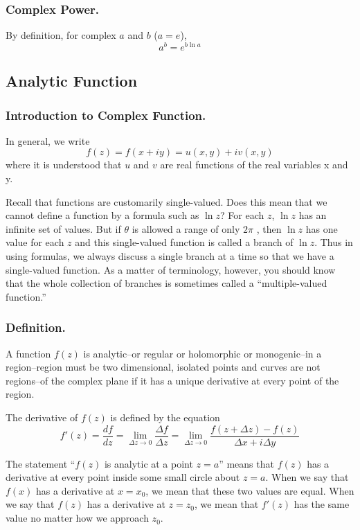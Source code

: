 \documentclass[../../../main.tex]{subfiles}
\begin{document}
\subsubsection{Complex Power.} By deﬁnition, for complex $a$ and $b$ ($a = e$),
\begin{equation*}
    a^b=e^{b\ln a}
\end{equation*}

\subsection{Analytic Function}
\subsubsection{Introduction to Complex Function.} In general, we write
\begin{equation*}
    f(z) = f(x + iy) = u(x, y) + iv(x, y)
\end{equation*}
where it is understood that $u$ and $v$ are real functions of the real variables x and y. 

Recall that functions are customarily single-valued. Does this mean that we cannot deﬁne a function by a formula such as $\ln z$? For each $z$, $\ln z$ has an inﬁnite set of values. But if $\theta$ is allowed a range of only $2\pi$ , then $\ln z$ has one value for each $z$ and this single-valued function is 
called a branch of $\ln z$. Thus in using formulas, we always discuss a single branch at a time so that we have a single-valued function. As a matter of terminology, however, you should know that the 
whole collection of branches is sometimes called a “multiple-valued function.”

\subsubsection{Definition.} A function $f(z)$ is analytic--or regular or holomorphic or monogenic--in a region--region must be two dimensional, isolated points and curves are not regions--of the complex plane if it has a unique derivative at every point of the region. 

 The derivative of $f(z)$ is deﬁned by the equation
 \begin{equation*}
    f'(z)=\frac{df}{dz}=\lim_{\Delta z\rightarrow 0}\frac{\Delta f}{\Delta z}=\lim_{\Delta z\rightarrow 0} \frac{f(z + \Delta z) - f(z)}{\Delta x + i\Delta y}
 \end{equation*}

The statement “$f(z)$ is analytic at a point $z = a$” means that $f(z)$ has a derivative at every point inside some small circle about $z = a$. When we say that $f(x)$ has a derivative at $x = x_0$, we mean that these two values are equal. When we say that $f(z)$ has a derivative at $z = z_0$, we mean that $f'(z)$ has the same value no matter how we approach $z_0$. 
\end{document}
